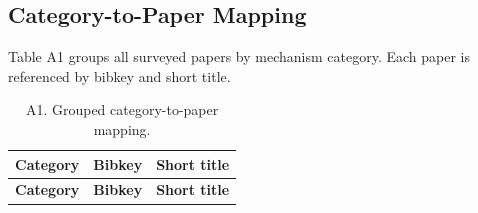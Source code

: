 \documentclass[pdflatex,sn-mathphys-num]{sn-jnl}
\begin{document}
\begin{appendices}
\section{Category-to-Paper Mapping}
Table A1 groups all surveyed papers by mechanism category. Each paper is referenced by bibkey and short title.

\scriptsize
\setlength{\LTleft}{0pt}
\setlength{\LTright}{0pt}
\setlength{\tabcolsep}{2pt}
\begin{longtable}{@{}P{2.9cm}P{2.3cm}P{6.4cm}@{}}
\caption{A1. Grouped category-to-paper mapping.}\label{tab:a1_mapping}\\
\toprule
\textbf{Category} & \textbf{Bibkey} & \textbf{Short title} \\
\midrule
\endfirsthead
\toprule
\textbf{Category} & \textbf{Bibkey} & \textbf{Short title} \\
\midrule
\endhead

\end{longtable}
\end{appendices}


\end{document}
